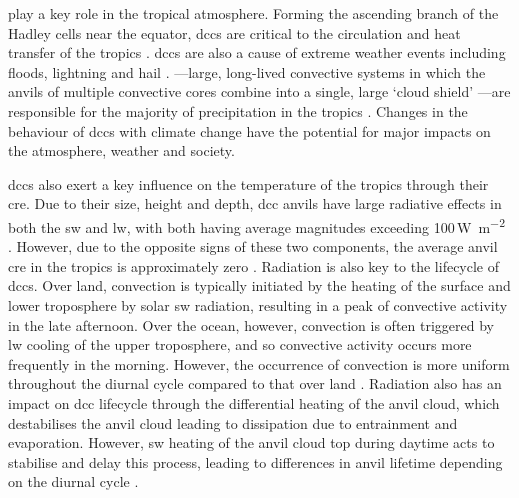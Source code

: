 \documentclass[acp, manuscript]{copernicus}
\begin{document}


\introduction  %

 play a key role in the tropical atmosphere. 
Forming the ascending branch of the Hadley cells near the equator, \acrshort{dcc}s are critical to the circulation and heat transfer of the tropics \citep{riehl_heat_1958, weisman_mesoscale_2015}. 
\acrshort{dcc}s are also a cause of extreme weather events including floods, lightning and hail \citep{westra_future_2014}. 
---large, long-lived convective systems in which the anvils of multiple convective cores combine into a single, large `cloud shield' \citep{chen_diurnal_1997, houze_mesoscale_2004, roca_simple_2017}---are responsible for the majority of precipitation in the tropics \citep{feng_global_2021}. 
Changes in the behaviour of \acrshort{dcc}s with climate change have the potential for major impacts on the atmosphere, weather and society.

\acrshort{dcc}s also exert a key influence on the temperature of the tropics through their \acrfull{cre}. 
Due to their size, height and depth, \acrshort{dcc} anvils have large radiative effects in both the \acrfull{sw} and \acrfull{lw}, with both having average magnitudes exceeding 100\,\unit{W m^{-2}} \citep{hartmann_tropical_2016, wall_balanced_2018}. 
However, due to the opposite signs of these two components, the average anvil \acrshort{cre} in the tropics is approximately zero \citep{ramanathan_cloudradiative_1989, hartmann_effect_1992, stephens_cloudsat_2018}. 
Radiation is also key to the lifecycle of \acrshort{dcc}s. 
Over land, convection is typically initiated by the heating of the surface and lower troposphere by solar \acrshort{sw} radiation, resulting in a peak of convective activity in the late afternoon. 
Over the ocean, however, convection is often triggered by \acrshort{lw} cooling of the upper troposphere, and so convective activity occurs more frequently in the morning. 
However, the occurrence of convection is more uniform throughout the diurnal cycle compared to that over land \citep{taylor_evaluating_2017}. 
Radiation also has an impact on \acrshort{dcc} lifecycle through the differential heating of the anvil cloud, which destabilises the anvil cloud leading to dissipation due to entrainment and evaporation. 
However, \acrshort{sw} heating of the anvil cloud top during daytime acts to stabilise and delay this process, leading to differences in anvil lifetime depending on the diurnal cycle \citep{harrop_role_2016, sokol_tropical_2020, wall_observational_2020}.
\end{document}
